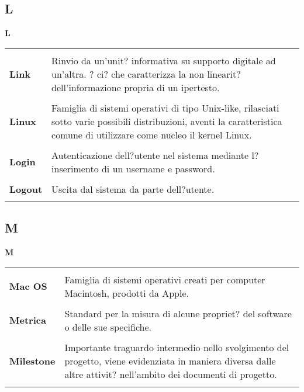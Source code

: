 {\subsection{L} 
\hfill\Huge{\textbf{L}} \\ 
\normalsize 
\begin{longtabu} to 
\toprule \\ 
\textbf{Link} & Rinvio da un'unit? informativa su supporto digitale ad un'altra. ? ci? che caratterizza la non linearit? dell'informazione propria di un ipertesto. \\ 
 \\ 
\textbf{Linux} & Famiglia di sistemi operativi di tipo Unix-like, rilasciati sotto varie possibili distribuzioni, aventi la caratteristica comune di utilizzare come nucleo il kernel Linux. \\ 
 \\ 
\textbf{Login} & Autenticazione dell?utente nel sistema mediante l?inserimento di un username e password. \\ 
 \\ 
\textbf{Logout} & Uscita dal sistema da parte dell?utente. \\ 
 \\ 
\end{longtabu} 
\newpage 
\subsection{M} 
\hfill\Huge{\textbf{M}} \\ 
\normalsize 
\begin{longtabu} to 
\toprule \\ 
\textbf{Mac OS} & Famiglia di sistemi operativi creati per computer Macintosh, prodotti da Apple. \\ 
 \\ 
\textbf{Metrica} & Standard per la misura di alcune propriet? del software o delle sue specifiche. \\ 
 \\ 
\textbf{Milestone} & Importante traguardo intermedio nello svolgimento del progetto, viene evidenziata in maniera diversa dalle altre attivit? nell'ambito dei documenti di progetto. \\ 
 \\ 
\end{longtabu} 
\newpage 
}
